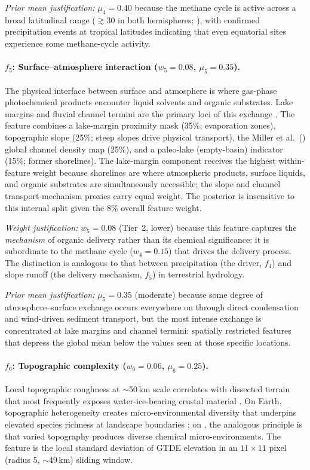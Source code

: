 \textit{Prior mean justification:} $\mu_4 = 0.40$ because the methane cycle is active across a broad latitudinal range ($\gtrsim$30\textdegree{} in both hemispheres; \citealt{MitchellLora2016}), with confirmed precipitation events at tropical latitudes \citep{Turtle2011} indicating that even equatorial sites experience some methane-cycle activity.

\paragraph{$f_5$: Surface--atmosphere interaction ($w_5 = 0.08$, $\mu_5 = 0.35$).}
The physical interface between surface and atmosphere is where gas-phase photochemical products encounter liquid solvents and organic substrates.  Lake margins and fluvial channel termini are the primary loci of this exchange \citep{Hayes2016,Miller2021channels}.  The feature combines a lake-margin proximity mask (35\%; evaporation zones), topographic slope (25\%; steep slopes drive physical transport), the Miller et al.\ (\citeyear{Miller2021channels}) global channel density map (25\%), and a paleo-lake (empty-basin) indicator (15\%; former shorelines). The lake-margin component receives the highest within-feature weight
because shorelines are where atmospheric products, surface liquids, and
organic substrates are simultaneously accessible; the slope and channel transport-mechanism proxies carry equal weight.  The posterior is insensitive to
this internal split given the 8\% overall feature weight.

\textit{Weight justification:} $w_5 = 0.08$ (Tier~2, lower) because this feature captures the \textit{mechanism} of organic delivery rather than its chemical significance: it is subordinate to the methane cycle ($w_4 = 0.15$) that drives the delivery process.  The distinction is analogous to that between precipitation (the driver, $f_4$) and slope runoff (the delivery mechanism, $f_5$) in terrestrial hydrology.

\textit{Prior mean justification:} $\mu_5 = 0.35$ (moderate) because some degree of atmosphere--surface exchange occurs everywhere on \titan{} through direct condensation and wind-driven sediment transport, but the most intense exchange is concentrated at lake margins and channel termini: spatially restricted features that depress the global mean below the values seen at those specific locations.


\paragraph{$f_6$: Topographic complexity ($w_6 = 0.06$, $\mu_6 = 0.25$).}
Local topographic roughness at $\sim$50\,km scale correlates with dissected terrain that most frequently exposes water-ice-bearing crustal material \citep{Lopes2019}.  On Earth, topographic heterogeneity creates micro-environmental diversity that underpins elevated species richness at landscape boundaries \citep{Stein2014}; on \titan{}, the analogous principle is that varied topography produces diverse chemical micro-environments.  The feature is the local standard deviation of GTDE elevation in an $11\times11$ pixel (radius 5, $\sim$49\,km) sliding window.

